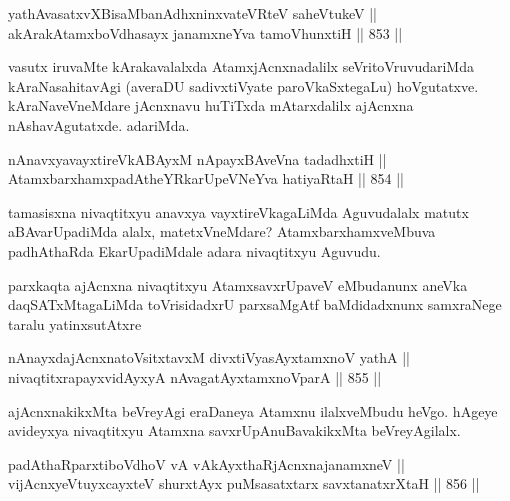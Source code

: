 \begin{shl}
yathAvasatxvXBisaMbanAdhxninxvateVRteV saheVtukeV || \\
akArakAtamxboVdhasayx janamxneYva tamoVhunxtiH \hfill || 853 ||  
\end{shl}

\begin{artha}
vasutx iruvaMte kArakavalalxda AtamxjAcnxnadalilx seVritoVruvudariMda kAraNasahitavAgi (averaDU sadivxtiVyate paroVkaSxtegaLu) hoVgutatxve. kAraNaveVneMdare jAcnxnavu huTiTxda mAtarxdalilx ajAcnxna nAshavAgutatxde. adariMda.
\end{artha}


\begin{shl}
nAnavxyavayxtireVkABAyxM nApayxBAveVna tadadhxtiH || \\
AtamxbarxhamxpadAtheYRkarUpeVNeYva hatiyaRtaH \hfill || 854 ||  
\end{shl}

\begin{artha}
tamasisxna nivaqtitxyu anavxya vayxtireVkagaLiMda Aguvudalalx matutx aBAvarUpadiMda alalx, matetxVneMdare? AtamxbarxhamxveMbuva padhAthaRda EkarUpadiMdale adara nivaqtitxyu Aguvudu.
\end{artha}

\begin{artha}
parxkaqta ajAcnxna nivaqtitxyu AtamxsavxrUpaveV eMbudanunx aneVka daqSATxMtagaLiMda toVrisidadxrU parxsaMgAtf baMdidadxnunx samxraNege taralu yatinxsutAtxre\ndash 
\end{artha}

\begin{shl}
nAnayxdajAcnxnatoV\s sitxtavxM divxtiVyasAyx\s \s tamxnoV yathA || \\
nivaqtitxrapayxvidAyxyA nAvagatAyxtamxnoV\s parA \hfill || 855 ||  
\end{shl}

\begin{artha}
ajAcnxnakikxMta beVreyAgi eraDaneya Atamxnu ilalxveMbudu heVgo. hAgeye avideyxya nivaqtitxyu Atamxna savxrUpAnuBavakikxMta beVreyAgilalx.
\end{artha}


\begin{shl}
padAthaRparxtiboVdhoV vA vAkAyxthaRjAcnxnajanamxneV || \\
vijAcnxyeVtuyxcayxteV shurxtAyx puMsasatxtarx savxtanatxrXtaH \hfill || 856 ||  
\end{shl}


